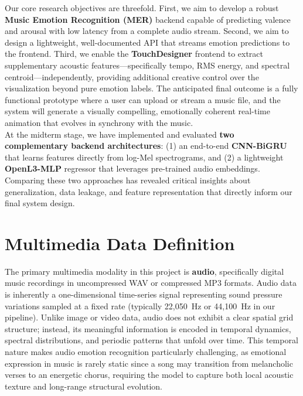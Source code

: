 \documentclass[12pt,a4paper]{article}
\begin{document}
Our core research objectives are threefold. First, we aim to develop a robust \textbf{Music Emotion Recognition (MER)} backend capable of predicting valence and arousal with low latency from a complete audio stream. Second, we aim to design a lightweight, well-documented API that streams emotion predictions to the frontend. Third, we enable the \textbf{TouchDesigner} frontend to extract supplementary acoustic features---specifically tempo, RMS energy, and spectral centroid---independently, providing additional creative control over the visualization beyond pure emotion labels. The anticipated final outcome is a fully functional prototype where a user can upload or stream a music file, and the system will generate a visually compelling, emotionally coherent real-time animation that evolves in synchrony with the music. \\

At the midterm stage, we have implemented and evaluated \textbf{two complementary backend architectures}: (1) an end-to-end \textbf{CNN-BiGRU} that learns features directly from log-Mel spectrograms, and (2) a lightweight \textbf{OpenL3-MLP} regressor that leverages pre-trained audio embeddings. Comparing these two approaches has revealed critical insights about generalization, data leakage, and feature representation that directly inform our final system design.

\section{Multimedia Data Definition}

The primary multimedia modality in this project is \textbf{audio}, specifically digital music recordings in uncompressed WAV or compressed MP3 formats. Audio data is inherently a one-dimensional time-series signal representing sound pressure variations sampled at a fixed rate (typically 22,050~Hz or 44,100~Hz in our pipeline). Unlike image or video data, audio does not exhibit a clear spatial grid structure; instead, its meaningful information is encoded in temporal dynamics, spectral distributions, and periodic patterns that unfold over time. This temporal nature makes audio emotion recognition particularly challenging, as emotional expression in music is rarely static since a song may transition from melancholic verses to an energetic chorus, requiring the model to capture both local acoustic texture and long-range structural evolution. \\
\end{document}

